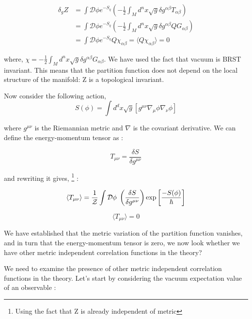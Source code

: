 \begin{align}
\delta_{g} Z&= \int \mathcal{D} \phi e^{-S_{q}} \left(-\frac{1}{2} \int_{M} d^{n} x 
\sqrt{g} \delta g^{\alpha\beta} T_{\alpha\beta}\right)\\
&=\int \mathcal{D} \phi e^{-S_{q}} \left(-\frac{1}{2} \int_{M} d^{n} x 
\sqrt{g} \delta g^{\alpha\beta} QG_{\alpha\beta}\right)\\
&=\int \mathcal{D} \phi e^{-S_{q}} Q\chi_{\alpha\beta} = \langle Q\chi_{\alpha\beta}\rangle = 0
\end{align}

where, $ \chi = - \frac{1}{2} \int_{M} d^{n}x \sqrt{g} \delta g^{\alpha\beta} G_{\alpha\beta}$. We have 
used the fact that vacuum is BRST invariant. 
This means that the partition function does not depend on the local structure of the manifold: 
Z is a topological invariant. 

Now consider the following action, 
\begin{equation}
S(\phi) = \int d^{d} x \sqrt{g} \left[g^{\mu\nu} \nabla_{\mu} \phi  \nabla_{\nu} \phi \right]
\end{equation}

where $g^{\mu\nu}$ is the Riemannian metric and $\nabla$ is the covariant derivative. We can define the energy-momentum tensor as :

\begin{equation}
T_{\mu\nu} = \frac{\delta S}{\delta g^{\mu\nu}} 
\end{equation}

and rewriting it gives, \footnote{Using the fact that Z is already independent of metric} : 


\begin{equation}
\langle T_{\mu\nu} \rangle =  \frac{1}{\mathcal{Z}}\int \mathcal{D} \phi \hspace{1mm} \left(\frac{\delta S}{\delta g^{\mu\nu}}\right) \exp\left[\frac{-S(\phi)}{\hbar}\right]  
\end{equation}

\begin{equation}
\langle T_{\mu\nu} \rangle= 0
\end{equation}


We have established that the metric variation of the partition function vanishes, and in turn that the energy-momentum tensor is zero, 
we now look whether we have other metric independent correlation functions in the theory?


We need to examine the presence of other metric independent correlation functions in the theory. 
Let's start by considering the vacuum expectation value of an observable :

